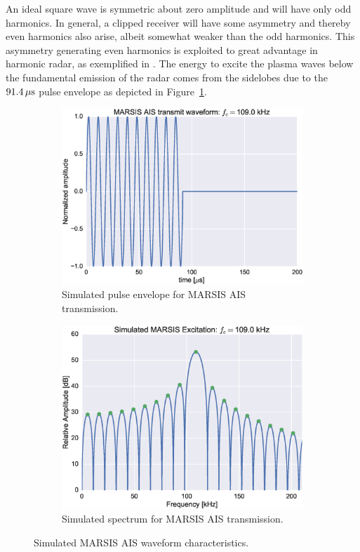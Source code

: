 An ideal square wave is symmetric about zero amplitude and will have only odd harmonics.
In general, a clipped receiver will have some asymmetry and thereby even harmonics also arise, albeit somewhat weaker than the odd harmonics.
This asymmetry generating even harmonics is exploited to great advantage in harmonic radar, as exemplified in \citet{harmonic}.
The energy to excite the plasma waves below the fundamental emission of the radar comes from the sidelobes due to the $\unit[91.4]{\mu s}$ pulse envelope as depicted in Figure~\ref{fig:marsispulse}.
\begin{figure}\centering
    \begin{subfigure}[t]{0.45\linewidth}\centering
        \includegraphics[width=\linewidth]{gfx/marsis_ais_wvfm}
        \caption{Simulated pulse envelope for MARSIS AIS transmission.}		
    \end{subfigure}
    \begin{subfigure}[t]{0.45\linewidth}\centering
        \includegraphics[width=\linewidth]{gfx/marsis_ais_spec}
        \caption{Simulated spectrum for MARSIS AIS transmission.}		
    \end{subfigure}
    \caption{Simulated MARSIS AIS waveform characteristics.}\label{fig:marsispulse}
\end{figure}
